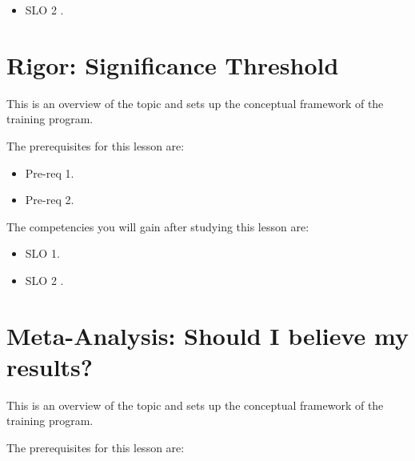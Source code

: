 \begin{itemize}
    \item SLO 2 .
\end{itemize}

\section{Rigor: Significance Threshold}
\label{sec:rigor-significance-threshold}

This is an overview of the topic and sets up the conceptual framework of the training program.




The prerequisites for this lesson are: 




\begin{itemize}
    \item Pre-req 1.
\end{itemize}

\begin{itemize}
    \item Pre-req 2.
\end{itemize}




The competencies you will gain after studying this lesson are: 




\begin{itemize}
    \item SLO 1.
\end{itemize}

\begin{itemize}
    \item SLO 2 .
\end{itemize}

\section{Meta-Analysis: Should I believe my results?}
\label{sec:meta-analysis-should-i-believe-my-results}

This is an overview of the topic and sets up the conceptual framework of the training program.




The prerequisites for this lesson are: 




